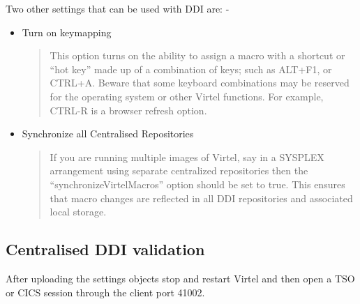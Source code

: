 \documentclass[letterpaper,10pt,english]{sphinxmanual}
\begin{document}
Two other settings that can be used with DDI are: -
\begin{itemize}
\item {} 
                        Turn on keymapping
\begin{quote}

This option turns on the ability to assign a macro with a shortcut or “hot key” made up of a combination of keys; such as ALT+F1, or CTRL+A.  Beware that some keyboard combinations may be reserved for the operating system or other Virtel functions. For example, CTRL-R is a browser refresh option.
\end{quote}

\item {} 
           Synchronize all Centralised Repositories
\begin{quote}

If you are running multiple images of Virtel, say in a SYSPLEX arrangement using separate centralized repositories then the “synchronizeVirtelMacros” option should be set to true. This ensures that macro changes are reflected in all DDI repositories and associated local storage.
\end{quote}

\end{itemize}

\ignorespaces 

\subsection{Centralised DDI validation}
\label{\detokenize{Customization:centralised-ddi-validation}}\label{\detokenize{Customization:index-90}}
After uploading the settings objects stop and restart Virtel and then open a TSO or CICS session through the client port 41002.

\begin{sphinxVerbatim}[commandchars=\\\{\}]
\end{sphinxVerbatim}
\end{document}
